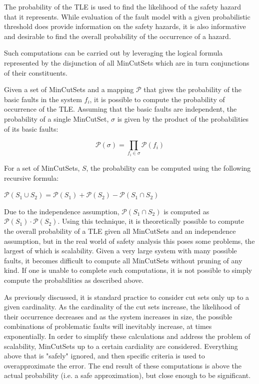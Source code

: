 The probability of the TLE is used to find the likelihood of the safety hazard that it represents. While evaluation of the fault model with a given probabilistic threshold does provide information on the safety hazards, it is also informative and desirable to find the overall probability of the occurrence of a hazard. 

Such computations can be carried out by leveraging the logical formula represented by the disjunction of all MinCutSets which are in turn conjunctions of their constituents. 

Given a set of MinCutSets and a mapping $\mathcal{P}$ that gives the probability of the basic faults in the system $f_i$, it is possible to compute the probability of occurrence of the TLE. Assuming that the basic faults are independent, the probability of a single MinCutSet, $\sigma$ is given by the product of the probabilities of its basic faults:
\begin{center}
    \begin{equation*}\mathcal{P}(\sigma) = \prod_{f_i \in \sigma} \mathcal{P}(f_i) 
    \end{equation*}    
\end{center}

For a set of MinCutSets, $S$, the probability can be computed using the following recursive formula:

\begin{center}
    $\mathcal{P}(S_1 \cup S_2) = \mathcal{P}(S_1) + \mathcal{P}(S_2) - \mathcal{P}(S_1 \cap S_2)$
\end{center}

Due to the independence assumption, $\mathcal{P}(S_1 \cap S_2)$ is computed as $\mathcal{P}(S_1) \cdot   \mathcal{P}(S_2)$. Using this technique, it is theoretically possible to compute the overall probability of a TLE given all MinCutSets and an independence assumption, but in the real world of safety analysis this poses some problems, the largest of which is scalability. Given a very large system with many possible faults, it becomes difficult to compute all MinCutSets without pruning of any kind. If one is unable to complete such computations, it is not possible to simply compute the probabilities as described above. 

As previously discussed, it is standard practice to consider cut sets only up to a given cardinality. As the cardinality of the cut sets increase, the likelihood of their occurrence decreases and as the system increases in size, the possible combinations of problematic faults will inevitably increase, at times exponentially. In order to simplify these calculations and address the problem of scalability, MinCutSets up to a certain cardiality are considered. Everything above that is "safely" ignored, and then specific criteria is used to overapproximate the error. The end result of these computations is above the actual probability (i.e. a safe approximation), but close enough to be significant. 

